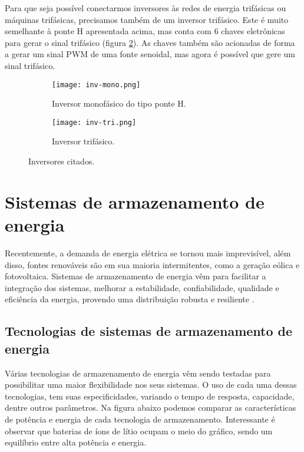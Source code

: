    Para que seja possível conectarmos inversores às redes de energia trifásicas ou máquinas trifásicas, precisamos também de um inversor trifásico. Este é muito semelhante à ponte H apresentada acima, mas conta com 6 chaves eletrônicas para gerar o sinal trifásico (figura \ref{fig:inv-tri}). As chaves também são acionadas de forma a gerar um sinal PWM de uma fonte senoidal, mas agora é possível que gere um sinal trifásico.

   \begin{figure}[!htb]
      \centering
         \begin{subfigure}{0.48\linewidth}
            \centering
            \texttt{[image: inv-mono.png]}
            \caption{Inversor monofásico do tipo ponte H.}
            \label{fig:inv-mono}
         \end{subfigure}
         \begin{subfigure}{0.48\linewidth}
            \centering
            \texttt{[image: inv-tri.png]}
            \caption{Inversor trifásico.}
            \label{fig:inv-tri}
         \end{subfigure}
      \caption{Inversores citados.}
      \label{fig:inv-esquematicos}
   \end{figure}


\section{Sistemas de armazenamento de energia}

   Recentemente, a demanda de energia elétrica se tornou mais imprevisível, além disso, fontes renováveis são em sua maioria intermitentes, como a geração eólica e fotovoltaica. Sistemas de armazenamento de energia vêm para facilitar a integração dos sistemas, melhorar a estabilidade, confiabilidade, qualidade e eficiência da energia, provendo uma distribuição robusta e resiliente \cite{Zob18}.

   \subsection{Tecnologias de sistemas de armazenamento de energia}

      Várias tecnologias de armazenamento de energia vêm sendo testadas para possibilitar uma maior flexibilidade nos seus sistemas. O uso de cada uma dessas tecnologias, tem suas especificidades, variando o tempo de resposta, capacidade, dentre outros parâmetros. Na figura abaixo podemos comparar as características de potência e energia de cada tecnologia de armazenamento. Interessante é observar que baterias de íons de lítio ocupam o meio do gráfico, sendo um equilíbrio entre alta potência e energia.

